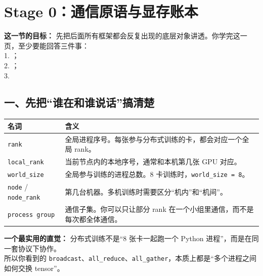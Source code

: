 
\section{Stage 0：通信原语与显存账本}

\begin{conceptbox}
\textbf{这一节的目标：} 先把后面所有框架都会反复出现的底层对象讲透。你学完这一页，至少要能回答三件事：\\
1. ；\\
2. ；\\
3. 
\end{conceptbox}


\subsection{一、先把“谁在和谁说话”搞清楚}

\begin{center}
\begin{tabular}{p{3.2cm}p{9.8cm}}
\hline
\textbf{名词} & \textbf{含义} \\
\hline
\texttt{rank} & 全局进程序号。每张参与分布式训练的卡，都会对应一个全局 rank。 \\
\texttt{local\_rank} & 当前节点内的本地序号，通常和本机第几张 GPU 对应。 \\
\texttt{world\_size} & 全局参与训练的进程总数。8 卡训练时，\texttt{world\_size = 8}。 \\
\texttt{node} / \texttt{node\_rank} & 第几台机器。多机训练时需要区分“机内”和“机间”。 \\
\texttt{process group} & 通信子集。你可以只让部分 rank 在一个小组里通信，而不是每次都全体通信。 \\
\hline
\end{tabular}
\end{center}

\begin{intubox}
\textbf{一个最实用的直觉：} 分布式训练不是“8 张卡一起跑一个 Python 进程”，而是在同一套协议下协作。\\
所以你看到的 \texttt{broadcast}、\texttt{all\_reduce}、\texttt{all\_gather}，本质上都是“多个进程之间如何交换 tensor”。
\end{intubox}

